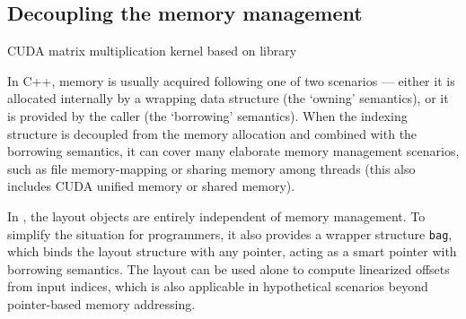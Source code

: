 

\subsection{Decoupling the memory management}

\begin{listing}
    \vspace{-10pt}
    \caption{CUDA matrix multiplication kernel based on \Noarr{} library}
	\vspace{-20pt}
    \label{lst:matmul}
\end{listing}

In C++, memory is usually acquired following one of two scenarios --- either it is allocated internally by a wrapping data structure (the `owning' semantics), or it is provided by the caller (the `borrowing' semantics). When the indexing structure is decoupled from the memory allocation and combined with the borrowing semantics, it can cover many elaborate memory management scenarios, such as file memory-mapping or sharing memory among threads (this also includes CUDA unified memory or shared memory).

In \Noarr{}, the layout objects are entirely independent of memory management. To simplify the situation for programmers, it also provides a wrapper structure \texttt{bag}, which binds the layout structure with any pointer, acting as a smart pointer with borrowing semantics. The layout can be used alone to compute linearized offsets from input indices, which is also applicable in hypothetical scenarios beyond pointer-based memory addressing.

